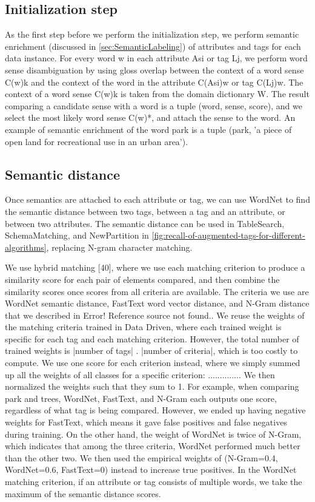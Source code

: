 \subsection{Initialization step}

As the first step before we perform the initialization step, we perform semantic enrichment (discussed in \autoref{sec:SemanticLabeling}) of attributes and tags for each data instance. For every word w in each attribute Asi or tag Lj, we perform word sense disambiguation by using gloss overlap between the context of a word sense C(w)k and the context of the word in the attribute C(Asi)w or tag C(Lj)w. The context of a word sense C(w)k is taken from the domain dictionary W. The result comparing a candidate sense with a word is a tuple (word, sense, score), and we select the most likely word sense C(w)*, and attach the sense to the word. An example of semantic enrichment of the word park is a tuple (park, 'a piece of open land for recreational use in an urban area').

\subsection{Semantic distance}

Once semantics are attached to each attribute or tag, we can use WordNet to find the semantic distance between two tags, between a tag and an attribute, or between two attributes. The semantic distance can be used in TableSearch, SchemaMatching, and NewPartition in \autoref{fig:recall-of-augmented-tags-for-different-algorithms}, replacing N-gram character matching.

We use hybrid matching \cite{Rahm2001Survey}[40], where we use each matching criterion to produce a similarity score for each pair of elements compared, and then combine the similarity scores once scores from all criteria are available. The criteria we use are WordNet semantic distance, FastText word vector distance, and N-Gram distance that we described in Error! Reference source not found.. We reuse the weights of the matching criteria trained in Data Driven, where each trained weight is specific for each tag and each matching criterion. However, the total number of trained weights is |number of tags| . |number of criteria|, which is too costly to compute. We use one score for each criterion instead, where we simply summed up all the weights of all classes for a specific criterion: ..............
We then normalized the weights such that they sum to 1. For example, when comparing park and trees, WordNet, FastText, and N-Gram each outputs one score, regardless of what tag is being compared. However, we ended up having negative weights for FastText, which means it gave false positives and false negatives during training. On the other hand, the weight of WordNet is twice of N-Gram, which indicates that among the three criteria, WordNet performed much better than the other two. We then used the empirical weights of (N-Gram=0.4, WordNet=0.6, FastText=0) instead to increase true positives. In the WordNet matching criterion, if an attribute or tag consists of multiple words, we take the maximum of the semantic distance scores.

